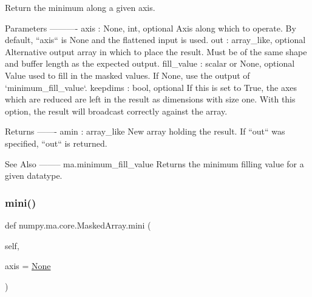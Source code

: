 \begin{DoxyVerb}Return the minimum along a given axis.

Parameters
----------
axis : {None, int}, optional
    Axis along which to operate.  By default, ``axis`` is None and the
    flattened input is used.
out : array_like, optional
    Alternative output array in which to place the result.  Must be of
    the same shape and buffer length as the expected output.
fill_value : scalar or None, optional
    Value used to fill in the masked values.
    If None, use the output of `minimum_fill_value`.
keepdims : bool, optional
    If this is set to True, the axes which are reduced are left
    in the result as dimensions with size one. With this option,
    the result will broadcast correctly against the array.

Returns
-------
amin : array_like
    New array holding the result.
    If ``out`` was specified, ``out`` is returned.

See Also
--------
ma.minimum_fill_value
    Returns the minimum filling value for a given datatype.\end{DoxyVerb}
 \mbox{\label{classnumpy_1_1ma_1_1core_1_1MaskedArray_a59fb7098c0a6b207ad0ac3ebc9b77332}} 
\subsubsection{\texorpdfstring{mini()}{mini()}}
{\footnotesize\ttfamily def numpy.\+ma.\+core.\+Masked\+Array.\+mini (\begin{DoxyParamCaption}\item[{}]{self,  }\item[{}]{axis = {\ttfamily \hyperlink{namespacenumpy_1_1ma_1_1core_a647ee1848dfa3692fe35a663a2aa40b3}{None}} }\end{DoxyParamCaption})}


